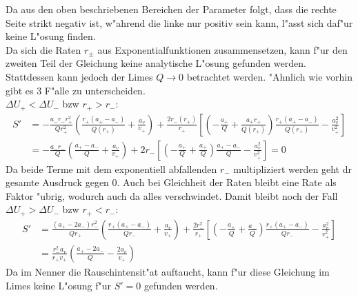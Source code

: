 \documentclass[12pt,a4paper]{article}
\begin{document}
Da aus den oben beschriebenen Bereichen der Parameter folgt, dass die rechte Seite strikt negativ ist, w"ahrend die linke nur positiv sein kann, l"asst sich daf"ur keine L"osung finden.\\
Da sich die Raten $r_\pm$ aus Exponentialfunktionen zusammensetzen, kann f"ur den zweiten Teil der Gleichung keine analytische L"osung gefunden werden. Stattdessen kann jedoch der Limes $Q\rightarrow0$ betrachtet werden. "Ahnlich wie vorhin gibt es 3 F"alle zu unterscheiden.\\
$\Delta U_+<\Delta U_-$ bzw $r_+>r_-$:
\begin{align*}\nonumber
S'&=-\frac{a_-r_-r_+^2}{Qr_+^2}\left(\frac{r_+(a_+-a_-)}{Q(r_+)}+\frac{a_v}{v_+}\right)+\frac{2r_-(r_+)}{r_+}\left[\left(-\frac{a_+}{Q}+\frac{a_+r_+}{Q(r_+)}\right)\frac{r_+(a_+-a_-)}{Q(r_+)}-\frac{a_v^2}{v_+^2}\right]\\
&=-\frac{a_-r_-}{Q}\left(\frac{a_+-a_-}{Q}+\frac{a_v}{v_+}\right)+2r_-\left[\left(-\frac{a_+}{Q}+\frac{a_+}{Q}\right)\frac{a_+-a_-}{Q}-\frac{a_v^2}{v_+^2}\right]=0
\end{align*}
Da beide Terme mit dem exponentiell abfallenden $r_-$ multipliziert werden geht dr gesamte Ausdruck gegen 0. Auch bei Gleichheit der Raten bleibt eine Rate als Faktor "ubrig, wodurch auch da alles verschwindet. Damit bleibt noch der Fall $\Delta U_+>\Delta U_-$ bzw $r_+<r_-$:
\begin{align*}
S'&=\frac{(a_+-2a_-)r_-^2}{Qr_+}\left(\frac{r_+(a_+-a_-)}{Qr_-}+\frac{a_v}{v_+}\right)+\frac{2r_-^2}{r_+}\left[\left(-\frac{a_+}{Q}+\frac{a_-}{Q}\right)\frac{r_+(a_+-a_-)}{Qr_-}-\frac{a_v^2}{v_+^2}\right]\\
&=\frac{r_-^2a_v}{r_+v_+}\left(\frac{a_+-2a_-}{Q}-\frac{2a_v}{v_+}\right)
\end{align*}
Da im Nenner die Rauschintensit"at auftaucht, kann f"ur diese Gleichung im Limes keine L"osung f"ur $S'=0$ gefunden werden.
\end{document}
